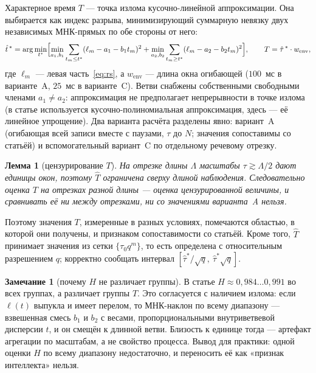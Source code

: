 \documentclass[11pt,a4paper]{article}
\theoremstyle{definition}
\newtheorem{zam}{Замечание}[section]
\theoremstyle{plain}
\newtheorem{lem}{Лемма}[section]
\begin{document}
Характерное время $T$ --- точка излома кусочно-линейной аппроксимации. Она
выбирается как индекс разрыва, минимизирующий суммарную невязку двух
независимых МНК-прямых по обе стороны от него:
\begin{equation}\label{eq:hinge}
\hat t^{\,*}=\arg\min_{t^*}\Bigl[\min_{a_1,b_1}\sum_{t_m\le t^*} (\ell_m-a_1-b_1t_m)^2
+\min_{a_2,b_2}\sum_{t_m\ge t^*}(\ell_m-a_2-b_2t_m)^2\Bigr],
\qquad T=\hat\tau^{\,*}\cdot w_{\text{env}},
\end{equation}
где $\ell_m$ --- левая часть~\eqref{eq:rs}, а $w_{\text{env}}$ --- длина окна
огибающей ($100$~мс в варианте~A, $25$~мс в варианте~C). Ветви снабжены
собственными свободными членами $a_1\ne a_2$: аппроксимация не предполагает
непрерывности в точке излома (в статье используется кусочно-полиномиальная
аппроксимация, здесь --- её линейное упрощение). Два варианта расчёта разделены явно:
вариант~A (огибающая всей записи вместе с паузами, $\tau$ до $N$; значения
сопоставимы со статьёй) и вспомогательный вариант~C по отдельному речевому
отрезку.

\begin{lem}[цензурирование $T$]
На отрезке длины $\Lambda$ масштабы $\tau\gtrsim\Lambda/2$ дают единицы окон,
поэтому $\hat T$ ограничена сверху длиной наблюдения. Следовательно оценка
$T$ на отрезках разной длины --- оценка \emph{цензурированной} величины, и
сравнивать её ни между отрезками, ни со значениями варианта~A нельзя.
\end{lem}

Поэтому значения $T$, измеренные в разных условиях, помечаются областью, в
которой они получены, и признаком сопоставимости со статьёй. Кроме того, $\hat T$
принимает значения из сетки $\{\tau_0q^m\}$, то есть определена с относительным
разрешением $q$; корректно сообщать интервал $[\hat\tau^*/\sqrt q,\ \hat\tau^*\sqrt q]$.

\begin{zam}[почему $H$ не различает группы]
В статье $H\approx0{,}984\dots0{,}991$ во всех группах, а различает группы $T$.
Это согласуется с наличием излома: если $\ell(t)$ выпукла и имеет перелом, то
МНК-наклон по всему диапазону --- взвешенная смесь $b_1$ и $b_2$ с весами,
пропорциональными внутриветвевой дисперсии $t$, и он смещён к длинной ветви.
Близость к единице тогда --- артефакт агрегации по масштабам, а не свойство
процесса. Вывод для практики: одной оценки $H$ по всему диапазону недостаточно,
и переносить её как «признак интеллекта» нельзя.
\end{zam}
\end{document}
